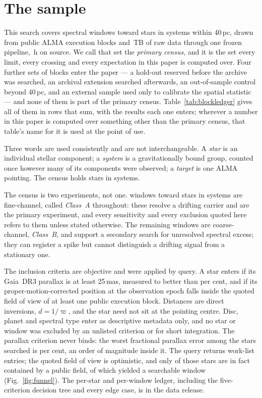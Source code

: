 \section{The sample}
\label{sec:sample}

This search covers \NWindows{} spectral windows toward \NStars{}
stars in \NSystems{} systems within 40\,pc, drawn from \NEB{}
public ALMA execution blocks and \TotalDataTB\,TB of raw data through one
frozen pipeline, \LdgCensusHours\,h on source. We call that set the
\emph{primary census}, and it is the set every limit, every crossing and
every expectation in this paper is computed over. Four further sets of blocks
enter the paper --- a hold-out reserved before the archive was searched, an
archival extension searched afterwards, an out-of-sample control beyond
40\,pc, and an external sample used only to calibrate the spatial statistic
--- and none of them is part of the primary census.
Table~\ref{tab:blockledger} gives all of them in rows that sum, with the
results each one enters; wherever a number in this paper is computed over
something other than the primary census, that table's name for it is used at
the point of use.

Three words are used consistently and are not interchangeable. A \emph{star}
is an individual stellar component; a \emph{system} is a gravitationally
bound group, counted once however many of its components were observed; a
\emph{target} is one ALMA pointing. The census holds \NStars{} stars
in \NSystems{} systems.

The census is two experiments, not one. \NWinA{} windows toward
\LdgClassAStars{} stars in \NSysClassA{} systems are fine-channel, called
\emph{Class~A} throughout: these resolve a drifting carrier and are the
primary experiment, and every sensitivity and every exclusion quoted here
refers to them unless stated otherwise. The remaining \NWinB{} windows
are coarse-channel, \emph{Class~B}, and support a secondary search for
unresolved spectral excess; they can register a spike but cannot distinguish
a drifting signal from a stationary one.

The inclusion criteria are objective and were applied by query. A star enters
if its Gaia~DR3 parallax is at least 25\,mas, measured to better than
\PlxAdqlPct{} per cent, and if its proper-motion-corrected position at the
observation epoch falls inside the quoted field of view of at least one
public execution block. Distances are direct inversions, $d=1/\varpi$, and
the star need not sit at the pointing centre. Disc, planet and spectral type
enter as descriptive metadata only, and no star or window was excluded by an
unlisted criterion or for short integration. The parallax criterion never
binds: the worst fractional parallax error among the stars searched is
\SfPlxWorstPct{} per cent, an order of magnitude inside it. The query returns
\NCensus{} work-list entries; the quoted field of view is optimistic, and
only \NGenuinelyCovered{} of those stars are in fact contained by a public
field, of which \NStars{} yielded a searchable window
(Fig.~\ref{fig:funnel}). The per-star and per-window ledger, including the
five-criterion decision tree and every edge case, is in the data release.

